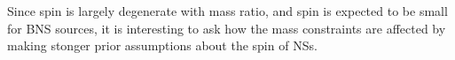 Since spin is largely degenerate with mass ratio, and spin is expected to be small for BNS sources, it is interesting to ask how the mass constraints are affected by making stonger prior assumptions about the spin of NSs.